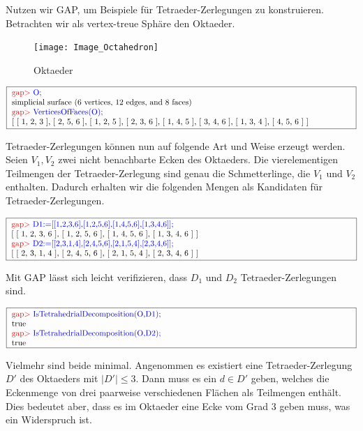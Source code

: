 \documentclass[12pt,titlepage,twoside,cleardoublepage]{article}
\theoremstyle{nummermitklammern}
\numberwithin{equation}{section}
\begin{document}
Nutzen wir GAP, um Beispiele für Tetraeder-Zerlegungen zu konstruieren. Betrachten wir als vertex-treue Sphäre den Oktaeder.
\begin{figure}[H]
\begin{center}
\texttt{[image: Image\_Octahedron]}
\end{center}
\caption{Oktaeder}
\end{figure}
\begin{center}
$\fbox{
\parbox{15cm}{
\textcolor{red}{gap$>$} \textcolor{blue}{O;}\newline 
simplicial surface (6 vertices, 12 edges, and 8 faces) \newline
\textcolor{red}{gap$>$} \textcolor{blue}{VerticesOfFaces(O);}\newline
[ [ 1, 2, 3 ], [ 2, 5, 6 ], [ 1, 2, 5 ], [ 2, 3, 6 ], [ 1, 4, 5 ],  [ 3, 4, 6 ], [ 1, 3, 4 ], [ 4, 5, 6 ] ]
}}$
\end{center}
Tetraeder-Zerlegungen können nun auf folgende Art und Weise  erzeugt werden.
Seien $V_1,V_2$ zwei nicht benachbarte Ecken des Oktaeders.
Die vierelementigen Teilmengen der Tetraeder-Zerlegung sind genau die Schmetterlinge, die $V_1$ und $V_2$ enthalten. Dadurch erhalten wir die folgenden Mengen als Kandidaten für Tetraeder-Zerlegungen.
\begin{center}
$\fbox{
\parbox{15cm}{
\textcolor{red}{gap$>$}  \textcolor{blue}{D1:=[[1,2,3,6],[1,2,5,6],[1,4,5,6],[1,3,4,6]];}\newline
[ [ 1, 2, 3, 6 ], [ 1, 2, 5, 6 ], [ 1, 4, 5, 6 ], [ 1, 3, 4, 6 ] ]\newline
\textcolor{red}{gap$>$}  \textcolor{blue}{D2:=[[2,3,1,4],[2,4,5,6],[2,1,5,4],[2,3,4,6]];}\newline
[ [ 2, 3, 1, 4 ], [ 2, 4, 5, 6 ], [ 2, 1, 5, 4 ], [ 2, 3, 4, 6 ] ]
}}$
\end{center}
Mit GAP lässt sich leicht verifizieren, dass $D_1$ und $D_2$  Tetraeder-Zerlegungen sind.
\begin{center}
$\fbox{
\parbox{15cm}{
\textcolor{red}{gap$>$}  \textcolor{blue}{IsTetrahedrialDecomposition(O,D1);}\newline
 true \newline
\textcolor{red}{gap$>$}  \textcolor{blue}{IsTetrahedrialDecomposition(O,D2);}\newline
 true
 }}$ 
 \end{center}
Vielmehr sind beide minimal. Angenommen es existiert eine Tetraeder-Zerlegung $D'$ des Oktaeders mit $\vert D' \vert\leq 3$. Dann muss es ein $d\in D'$ geben, welches die Eckenmenge von drei paarweise verschiedenen Flächen als Teilmengen enthält. Dies bedeutet aber, dass es im Oktaeder eine Ecke vom Grad 3 geben muss, was ein Widerspruch ist. 
\end{document}
